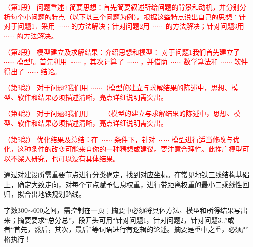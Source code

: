 
{\song\xiaosihao
\setlength{\parindent}{2em}\textcolor{red}{（第1段）	问题重述+简要思想：首先简要叙述所给问题的背景和动机，并分别分析每个小问题的特点（以下以三个问题为例）。根据这些特点说出自己的思想：针对于问题1，采用~$\cdots \cdots$ 的方法解决；针对问题2用~$\cdots \cdots$ 的方法解决；针对问题3用~$\cdots \cdots$ 的方法解决。}


\setlength{\parindent}{2em}\textcolor{red}{（第2段）	模型建立及求解结果：介绍思想和模型： 对于问题1我们首先建立了~$\cdots \cdots$ 模型I。首先利用~$\cdots \cdots$ ，其次计算了~$\cdots \cdots$ ，并借助~$\cdots \cdots$ 数学算法和~$\cdots \cdots$ 软件得出了~$\cdots \cdots$ 结论。}

\setlength{\parindent}{2em} \textcolor{red}{（第3段）	对于问题2我们用~$\cdots \cdots$（模型的建立与求解结果的陈述中，思想、模型、软件和结果必须描述清晰，亮点详细说明需突出。}

\setlength{\parindent}{2em}\textcolor{red}{（第4段）	对于问题3我们用~$\cdots \cdots$ （模型的建立与求解结果的陈述中，思想、模型、软件和结果必须描述清晰，亮点详细说明需突出。}

\setlength{\parindent}{2em}\textcolor{red}{（第5段）	优化结果及总结：在~$\cdots \cdots$ 条件下，针对~$\cdots \cdots$ 模型进行适当修改与优化，这种条件的改变可能来自你的一种猜想或建议。要注意合理性。此推广模型可以不深入研究，也可以没有具体结果。}
}

通过对建设所需重要节点进行分类确定，找到对应坐标。在常见地铁三线结构基础上，确定大致走向，对每个节点赋予信息权重，进行带距离权重的最小二乘线性回归，拟合出地铁规划路线。

\begin{rmk}
字数300$\sim $600之间，需控制在一页；摘要中必须将具体方法、模型和所得结果写出来；摘要要求“总分总”，段开头可用“针对问题1，针对问题2，针对问题3..”或者“首先，然后，其次，最后”等词语进行有逻辑的论述。摘要是重中之重，必须严格执行！
\end{rmk}






